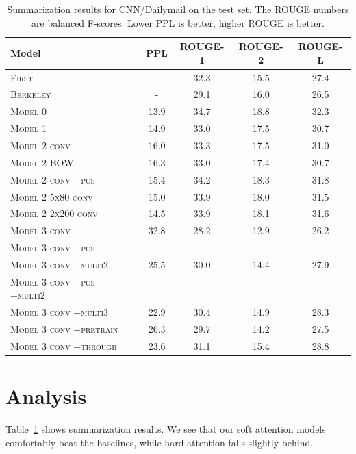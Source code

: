 \documentclass[12pt]{report}
\begin{document}
\begin{table}[h]
\centering
\begin{tabular}{llcccc}
 \toprule
 Model &  & PPL & ROUGE-1 & ROUGE-2 & ROUGE-L \\
 \midrule
\textsc{First} & & - & 32.3 & 15.5 & 27.4 \\
\textsc{Berkeley} & & - & 29.1 & 16.0 & 26.5 \\
\midrule
\textsc{Model 0} & & 13.9 & 34.7 & 18.8 & 32.3 \\
\midrule
 \textsc{Model 1} & & 14.9 & 33.0 & 17.5 & 30.7 \\
\midrule
\textsc{Model 2 conv} & & 16.0 & 33.3 & 17.5 & 31.0 \\
\textsc{Model 2 BOW} & & 16.3 & 33.0 & 17.4 & 30.7 \\
\textsc{Model 2 conv +pos} & & 15.4 & 34.2 & 18.3 & 31.8 \\
\textsc{Model 2 5x80 conv} & & 15.0 & 33.9 & 18.0 & 31.5 \\
\textsc{Model 2 2x200 conv} & & 14.5 & 33.9 & 18.1 & 31.6 \\
\midrule
\textsc{Model 3 conv} & & 32.8 & 28.2 & 12.9 & 26.2 \\
\textsc{Model 3 conv +pos} & &  \\
\textsc{Model 3 conv +multi2} & & 25.5 & 30.0 & 14.4 & 27.9 \\
\textsc{Model 3 conv +pos +multi2} & &  \\
\textsc{Model 3 conv +multi3} & & 22.9 & 30.4 & 14.9 & 28.3 \\
\textsc{Model 3 conv +pretrain} & & 26.3 & 29.7 & 14.2 & 27.5\\
\textsc{Model 3 conv +through} & & 23.6 & 31.1 & 15.4 & 28.8 \\
 \bottomrule
\end{tabular}
\caption{Summarization results for CNN/Dailymail on the test set. The ROUGE numbers are balanced F-scores. Lower PPL is better, higher ROUGE is better.}
\label{table:summary}
\end{table}


\section{Analysis}


Table~\ref{table:summary} shows summarization results. We see that our soft attention models comfortably beat the baselines, while hard attention falls slightly behind.
\end{document}
